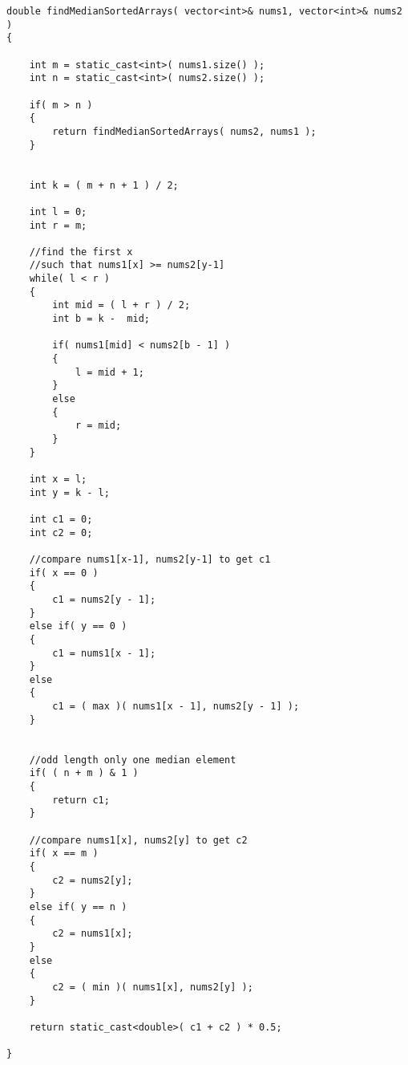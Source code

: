 \setcounter{lstlisting}{0}
\begin{lstlisting}[style=customc,caption={Binary Search}]
double findMedianSortedArrays( vector<int>& nums1, vector<int>& nums2 )
{

    int m = static_cast<int>( nums1.size() );
    int n = static_cast<int>( nums2.size() );

    if( m > n )
    {
        return findMedianSortedArrays( nums2, nums1 );
    }


    int k = ( m + n + 1 ) / 2;

    int l = 0;
    int r = m;

    //find the first x
    //such that nums1[x] >= nums2[y-1]
    while( l < r )
    {
        int mid = ( l + r ) / 2;
        int b = k -  mid;

        if( nums1[mid] < nums2[b - 1] )
        {
            l = mid + 1;
        }
        else
        {
            r = mid;
        }
    }

    int x = l;
    int y = k - l;

    int c1 = 0;
    int c2 = 0;

    //compare nums1[x-1], nums2[y-1] to get c1
    if( x == 0 )
    {
        c1 = nums2[y - 1];
    }
    else if( y == 0 )
    {
        c1 = nums1[x - 1];
    }
    else
    {
        c1 = ( max )( nums1[x - 1], nums2[y - 1] );
    }


    //odd length only one median element
    if( ( n + m ) & 1 )
    {
        return c1;
    }

    //compare nums1[x], nums2[y] to get c2
    if( x == m )
    {
        c2 = nums2[y];
    }
    else if( y == n )
    {
        c2 = nums1[x];
    }
    else
    {
        c2 = ( min )( nums1[x], nums2[y] );
    }

    return static_cast<double>( c1 + c2 ) * 0.5;

}
\end{lstlisting}